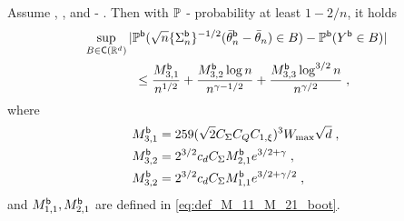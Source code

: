 \begin{theorem}
\label{GAR bootstrap}
Assume , , and  - . Then with $\mathbb{P}$ - probability at least $1 - 2/n$, it holds
\begin{equation}
\begin{split}
    &\sup_{B \in \mathsf{C}(\mathbb{R}^d)}|\mathbb{P}^{\mathsf{b}}( \sqrt n\{\Sigma_n^{\mathsf{b}}\}^{-1/2}   (\bar{\theta}_{n}^{\mathsf{b}} - \bar{\theta}_n) \in B) - \mathbb{P}^{\mathsf{b}}(Y^{\mathsf{b}} \in B)|  \\ &\qquad\qquad\le \frac{M_{3,1}^{\mathsf{b}}}{n^{1/2}}  +  \frac{M_{3,2}^{\mathsf{b}}  \log n}{n^{\gamma-1/2}}  + \frac{M_{3,3}^{\mathsf{b}} \log^{3/2} n}{n^{\gamma/2}} \;,
    \end{split}
\end{equation}
where
\begin{equation}
\label{M_3i boot def}
\begin{split}
    &M_{3,1}^{\mathsf{b}} = 259  (\sqrt{2} C_\Sigma C_Q C_{1, \xi})^3W_{\max} \sqrt{d} \;,\\ 
    &M_{3,2}^{\mathsf{b}} =2^{3/2}c_dC_{\Sigma}M_{2,1}^{\mathsf{b}}  e^{3/2+\gamma}\;, \\
    &M_{3,2}^{\mathsf{b}} =  2^{3/2}c_d C_{\Sigma}M_{1,1}^{\mathsf{b}} e^{3/2+\gamma/2}\;, 
\end{split}   
\end{equation}
and $M_{1,1}^{\mathsf{b}}, M_{2,1}^{\mathsf{b}}$ are defined in \eqref{eq:def_M_11_M_21_boot}.
\end{theorem}


